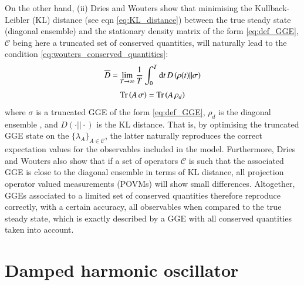 On the other hand, (ii) Dries and Wouters \cite{sels2015stationary} show that minimising the Kullback-Leibler (KL) distance (see eqn \ref{eq:KL_distance}) between the true steady state (diagonal ensemble) and the stationary density matrix of the form \ref{eq:def_GGE}, $\mathcal{C}$ being here a truncated set of conserved quantities, will naturally lead to the condition \ref{eq:wouters_conserved_quantities}:
\begin{equation}
    \label{eq:KL_distance}
    \overline{D} = \lim_{T \to \infty} \frac{1}{T} \int_0^T {\rm d}t \, D\left( \rho(t) \vert \vert \sigma \right)
\end{equation}
\begin{equation}
\label{eq:wouters_conserved_quantities}
    \mathrm{Tr}\left( A \, \sigma \right) = \mathrm{Tr}\left( A \, \rho_d \right)
\end{equation}
where $\sigma$ is a truncated GGE of the form \ref{eq:def_GGE}, $\rho_d$ is the diagonal ensemble \cite{sels2015stationary}, and $D\left( \cdot \vert \vert \cdot\right)$ is the KL distance.
That is, by optimising the truncated GGE state on the $\{ \lambda_A \}_{A \in \mathcal{C}}$, the latter naturally reproduces the correct expectation values for the observables included in the model.
Furthermore, Dries and Wouters \cite{sels2015stationary} also show that if a set of operators $\mathcal{C}$ is such that the associated GGE is close to the diagonal ensemble in terms of KL distance, all projection operator valued measurements (POVMs) will show small differences. 
Altogether, GGEs associated to a limited set of conserved quantities therefore reproduce correctly, with a certain accuracy, all observables when compared to the true steady state, which is exactly described by a GGE with all conserved quantities taken into account. 


%
%

\section{Damped harmonic oscillator}

